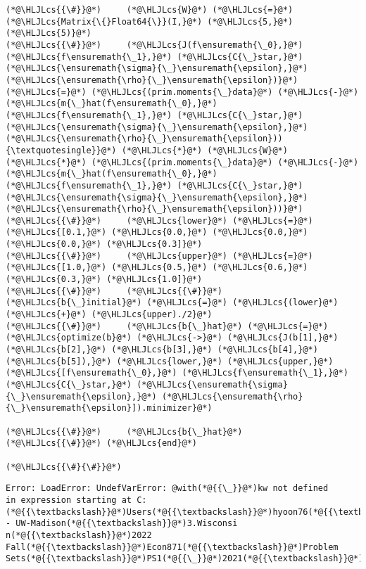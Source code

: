 \documentclass[12pt,a4paper]{article}
\newcommand{\HLJLcs}[1]{\textcolor[RGB]{153,153,119}{\textit{#1}}}
\begin{document}
\begin{lstlisting}
(*@\HLJLcs{{\#}}@*)     (*@\HLJLcs{W}@*) (*@\HLJLcs{=}@*) (*@\HLJLcs{Matrix{\{}Float64{\}}(I,}@*) (*@\HLJLcs{5,}@*) (*@\HLJLcs{5)}@*)
(*@\HLJLcs{{\#}}@*)     (*@\HLJLcs{J(f\ensuremath{\_0},}@*) (*@\HLJLcs{f\ensuremath{\_1},}@*) (*@\HLJLcs{C{\_}star,}@*) (*@\HLJLcs{\ensuremath{\sigma}{\_}\ensuremath{\epsilon},}@*) (*@\HLJLcs{\ensuremath{\rho}{\_}\ensuremath{\epsilon})}@*) (*@\HLJLcs{=}@*) (*@\HLJLcs{(prim.moments{\_}data}@*) (*@\HLJLcs{-}@*) (*@\HLJLcs{m{\_}hat(f\ensuremath{\_0},}@*) (*@\HLJLcs{f\ensuremath{\_1},}@*) (*@\HLJLcs{C{\_}star,}@*) (*@\HLJLcs{\ensuremath{\sigma}{\_}\ensuremath{\epsilon},}@*) (*@\HLJLcs{\ensuremath{\rho}{\_}\ensuremath{\epsilon})){\textquotesingle}}@*) (*@\HLJLcs{*}@*) (*@\HLJLcs{W}@*) (*@\HLJLcs{*}@*) (*@\HLJLcs{(prim.moments{\_}data}@*) (*@\HLJLcs{-}@*) (*@\HLJLcs{m{\_}hat(f\ensuremath{\_0},}@*) (*@\HLJLcs{f\ensuremath{\_1},}@*) (*@\HLJLcs{C{\_}star,}@*) (*@\HLJLcs{\ensuremath{\sigma}{\_}\ensuremath{\epsilon},}@*) (*@\HLJLcs{\ensuremath{\rho}{\_}\ensuremath{\epsilon}))}@*)
(*@\HLJLcs{{\#}}@*)     (*@\HLJLcs{lower}@*) (*@\HLJLcs{=}@*) (*@\HLJLcs{[0.1,}@*) (*@\HLJLcs{0.0,}@*) (*@\HLJLcs{0.0,}@*) (*@\HLJLcs{0.0,}@*) (*@\HLJLcs{0.3]}@*)
(*@\HLJLcs{{\#}}@*)     (*@\HLJLcs{upper}@*) (*@\HLJLcs{=}@*) (*@\HLJLcs{[1.0,}@*) (*@\HLJLcs{0.5,}@*) (*@\HLJLcs{0.6,}@*) (*@\HLJLcs{0.3,}@*) (*@\HLJLcs{1.0]}@*)
(*@\HLJLcs{{\#}}@*)     (*@\HLJLcs{{\#}}@*) (*@\HLJLcs{b{\_}initial}@*) (*@\HLJLcs{=}@*) (*@\HLJLcs{(lower}@*) (*@\HLJLcs{+}@*) (*@\HLJLcs{upper)./2}@*)
(*@\HLJLcs{{\#}}@*)     (*@\HLJLcs{b{\_}hat}@*) (*@\HLJLcs{=}@*) (*@\HLJLcs{optimize(b}@*) (*@\HLJLcs{->}@*) (*@\HLJLcs{J(b[1],}@*) (*@\HLJLcs{b[2],}@*) (*@\HLJLcs{b[3],}@*) (*@\HLJLcs{b[4],}@*) (*@\HLJLcs{b[5]),}@*) (*@\HLJLcs{lower,}@*) (*@\HLJLcs{upper,}@*) (*@\HLJLcs{[f\ensuremath{\_0},}@*) (*@\HLJLcs{f\ensuremath{\_1},}@*) (*@\HLJLcs{C{\_}star,}@*) (*@\HLJLcs{\ensuremath{\sigma}{\_}\ensuremath{\epsilon},}@*) (*@\HLJLcs{\ensuremath{\rho}{\_}\ensuremath{\epsilon}]).minimizer}@*)

(*@\HLJLcs{{\#}}@*)     (*@\HLJLcs{b{\_}hat}@*)
(*@\HLJLcs{{\#}}@*) (*@\HLJLcs{end}@*)

(*@\HLJLcs{{\#}{\#}}@*)
\end{lstlisting}

\begin{lstlisting}
Error: LoadError: UndefVarError: @with(*@{{\_}}@*)kw not defined
in expression starting at C:(*@{{\textbackslash}}@*)Users(*@{{\textbackslash}}@*)hyoon76(*@{{\textbackslash}}@*)OneDrive - UW-Madison(*@{{\textbackslash}}@*)3.Wisconsi
n(*@{{\textbackslash}}@*)2022 Fall(*@{{\textbackslash}}@*)Econ871(*@{{\textbackslash}}@*)Problem Sets(*@{{\textbackslash}}@*)PS1(*@{{\_}}@*)2021(*@{{\textbackslash}}@*)ps1(*@{{\_}}@*)2021(*@{{\_}}@*)Q2(*@{{\_}}@*)model(*@{{\_}}@*)hj.jl:9
\end{lstlisting}
\end{document}
